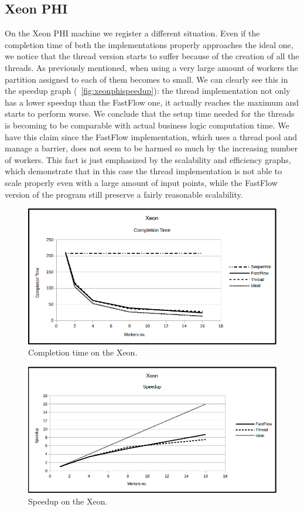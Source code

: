 \documentclass[10pt]{article}
\numberwithin{equation}{section}
\begin{document}
\subsection{Xeon PHI}
On the Xeon PHI machine we register a different situation. Even if the completion time of both the implementations properly approaches the ideal one, we notice that the thread version starts to suffer because of the creation of all the threads. As previously mentioned, when using a very large amount of workers the partition assigned to each of them becomes to small. We can clearly see this in the speedup graph (\figurename~\ref{fig:xeonphispeedup}): the thread implementation not only has a lower speedup than the FastFlow one, it actually reaches the maximum and starts to perform worse. We conclude that the setup time needed for the threads is becoming to be comparable with actual business logic computation time. We have this claim since the FastFlow implementation, which uses a thread pool and manage a barrier, does not seem to be harmed so much by the increasing number of workers. This fact is just emphasized by the scalability and efficiency graphs, which demonstrate that in this case the thread implementation is not able to scale properly even with a large amount of input points, while the FastFlow version of the program still preserve a fairly reasonable scalability.

\begin{figure} 
	\centering
	\includegraphics[scale=.5]{Xeon_CompletionTime.png}
	\caption{Completion time on the Xeon.}
	\label{fig:xeoncompletiontime}
\end{figure}

\begin{figure} 
	\centering
	\includegraphics[scale=.5]{Xeon_Speedup.png}
	\caption{Speedup on the Xeon.}
	\label{fig:xeonspeedup}
\end{figure}
\end{document}
